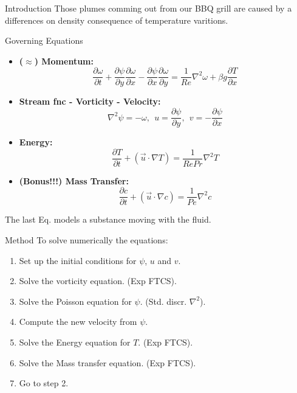 \documentclass[final]{beamer}
\newlength{\onecolwid}
\begin{document}
\begin{frame}[t]
\begin{columns}[t]
\begin{column}{\onecolwid}
\begin{block}{Introduction}
Those plumes comming out from our BBQ grill are caused by a differences on density consequence of temperature varitions.
\vspace{1em}
\begin{alertblock}{Governing Equations}
\begin{itemize}
\item \textbf{($\approx$) Momentum:}
$$\frac{\partial\omega}{\partial t}+\frac{\partial\psi}{\partial y}\frac{\partial\omega}{\partial x}-\frac{\partial\psi}{\partial x}\frac{\partial\omega}{\partial y}=\frac{1}{Re}\nabla^{2}\omega+\beta g\frac{\partial T}{\partial x}$$
\item \textbf{Stream fnc - Vorticity - Velocity:}
$$\nabla^{2}\psi=-\omega,\:\: u=\frac{\partial\psi}{\partial y},\:\: v=-\frac{\partial\psi}{\partial x}$$
\item \textbf{Energy:}
$$\frac{\partial T}{\partial t}+\left(\overrightarrow{u}\cdot\nabla T\right)=\frac{1}{RePr}\nabla^{2}T$$
\item \textbf{(Bonus!!!) Mass Transfer:}
$$\frac{\partial c}{\partial t}+\left(\overrightarrow{u}\cdot\nabla c\right)=\frac{1}{Pe}\nabla^{2}c$$
\end{itemize}
\end{alertblock}
The last Eq. models a substance moving with the fluid.
\end{block}

\vspace{-1em}
\begin{block}{Method}
To solve numerically the equations:
\begin{enumerate}
\item Set up the initial conditions for $\psi$, $u$ and $v$.
\item Solve the vorticity equation. (Exp FTCS).
\item Solve the Poisson equation for $\psi$. (Std. discr. $\nabla^{2}$).
\item Compute the new velocity from $\psi$.
\item Solve the Energy equation for $T$. (Exp FTCS).
\item Solve the Mass transfer equation. (Exp FTCS).
\item Go to step 2.
\end{enumerate}
\end{block}


\end{column}
\end{columns}
\end{frame}
\end{document}

